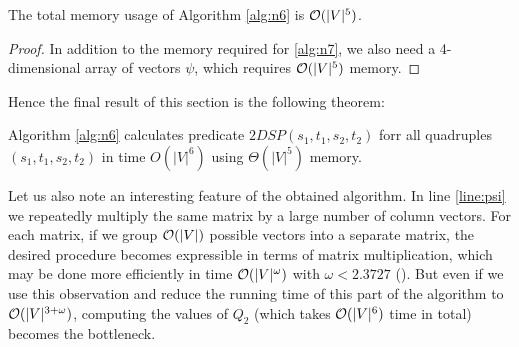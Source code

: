 \begin{proposition}
The total memory usage of Algorithm \ref{alg:n6} is $\mathcal{O}(|V|^5)$.
\end{proposition}
\begin{proof}
In addition to the memory required for \ref{alg:n7}, we also need a 4-dimensional array of vectors $\psi$, which requires $\mathcal{O}(|V|^5)$ memory.
\end{proof}

Hence the final result of this section is the following theorem:
\begin{theorem}
Algorithm \ref{alg:n6} calculates predicate $2DSP(s_1, t_1, s_2, t_2)$ forr all quadruples $(s_1, t_1, s_2, t_2)$ in time $O(|V|^6)$ using $\Theta(|V|^5)$ memory. 
\end{theorem}

Let us also note an interesting feature of the obtained algorithm. In line \ref{line:psi} we repeatedly multiply the same matrix by a large number of column vectors. For each matrix, if we group $\mathcal{O}(|V|)$ possible vectors into a separate matrix, the desired procedure becomes expressible in terms of matrix multiplication, which may be done more efficiently in time $\mathcal{O}(|V|^\omega)$ with $\omega < 2.3727$ (\cite{Williams}). But even if we use this observation and reduce the running time of this part of the algorithm to $\mathcal{O}(|V|^{{3 + \omega}})$, computing the values of $Q_2$ (which takes $\mathcal{O}(|V|^6)$ time in total) becomes the bottleneck.
